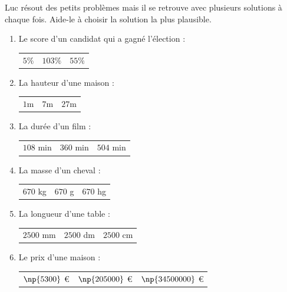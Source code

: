 \documentclass[a4paper,10pt]{report}
\begin{document}
\begin{ex}
Luc résout des petits problèmes mais il se retrouve avec plusieurs solutions à chaque fois. Aide-le à choisir la solution la plus plausible.

\begin{enumerate}
\item Le score d'un candidat qui a gagné l'élection :

\vspace{-8mm}
\begin{flushright}
\begin{tabular}{m{2cm}m{2cm}m{2cm}}
$5 \%$ & $103 \%$ & $55 \%$\\
\end{tabular}
\end{flushright}
\item La hauteur d'une maison :

\vspace{-8mm}
\begin{flushright}
\begin{tabular}{m{2cm}m{2cm}m{2cm}}
$1$m & $7$m & $27$m\\
\end{tabular}
\end{flushright}
\item La durée d'un film :

\vspace{-8mm}
\begin{flushright}
\begin{tabular}{m{2cm}m{2cm}m{2cm}}
$108$ min & $360$ min & $504$ min\\
\end{tabular}
\end{flushright}
\item La masse d'un cheval :

\vspace{-8mm}
\begin{flushright}
\begin{tabular}{m{2cm}m{2cm}m{2cm}}
$670$ kg & $670$ g & $670$ hg\\
\end{tabular}
\end{flushright}
\item La longueur d'une table :

\vspace{-8mm}
\begin{flushright}
\begin{tabular}{m{2cm}m{2cm}m{2cm}}
$2 500$ mm & $2 500$ dm & $2 500$ cm\\
\end{tabular}
\end{flushright}
\item Le prix d'une maison :

\vspace{-8mm}
\begin{flushright}
\begin{tabular}{m{2cm}m{2cm}m{2cm}}
$\np{5 300}$ \euro & $\np{205 000}$ \euro & $\np{34 500 000}$ \euro\\
\end{tabular}
\end{flushright}
\end{enumerate}
\end{ex}
\end{document}
